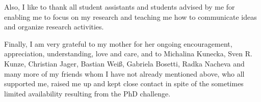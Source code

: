 Also, I like to thank all student assistants and students advised by me for enabling me to focus on my research and teaching me how to communicate ideas and organize research activities.

Finally, I am very grateful to my mother for her ongoing encouragement, appreciation, understanding, love and care, and to Michalina Kunecka, Sven R. Kunze, Christian Jager, Bastian Weiß, Gabriela Bosetti, Radka Nacheva and many more of my friends whom I have not already mentioned above, who all supported me, raised me up and kept close contact in spite of the sometimes limited availability resulting from the PhD challenge.

\cleardoublepage